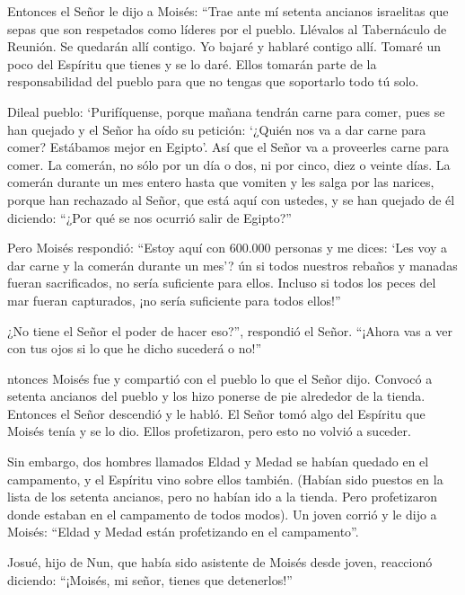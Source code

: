  Entonces el Señor le dijo a Moisés: ``Trae ante mí setenta
ancianos israelitas que sepas que son respetados como líderes por el
pueblo. Llévalos al Tabernáculo de Reunión. Se quedarán allí contigo.
 Yo bajaré y hablaré contigo allí. Tomaré un poco del
Espíritu que tienes y se lo daré. Ellos tomarán parte de la
responsabilidad del pueblo para que no tengas que soportarlo todo tú
solo.

 Dileal pueblo: `Purifíquense, porque mañana tendrán carne
para comer, pues se han quejado y el Señor ha oído su petición: `¿Quién
nos va a dar carne para comer? Estábamos mejor en Egipto'. Así que el
Señor va a proveerles carne para comer.  La comerán, no
sólo por un día o dos, ni por cinco, diez o veinte días. 
La comerán durante un mes entero hasta que vomiten y les salga por las
narices, porque han rechazado al Señor, que está aquí con ustedes, y se
han quejado de él diciendo: ``¿Por qué se nos ocurrió salir de Egipto?''

 Pero Moisés respondió: ``Estoy aquí con 600.000 personas y
me dices: `Les voy a dar carne y la comerán durante un mes'?
 ún si todos nuestros rebaños y manadas fueran
sacrificados, no sería suficiente para ellos. Incluso si todos los peces
del mar fueran capturados, ¡no sería suficiente para todos ellos!''

 ¿No tiene el Señor el poder de hacer eso?'', respondió el
Señor. ``¡Ahora vas a ver con tus ojos si lo que he dicho sucederá o
no!''

 ntonces Moisés fue y compartió con el pueblo lo que el
Señor dijo. Convocó a setenta ancianos del pueblo y los hizo ponerse de
pie alrededor de la tienda.  Entonces el Señor descendió y
le habló. El Señor tomó algo del Espíritu que Moisés tenía y se lo dio.
Ellos profetizaron, pero esto no volvió a suceder.

 Sin embargo, dos hombres llamados Eldad y Medad se habían
quedado en el campamento, y el Espíritu vino sobre ellos también.
(Habían sido puestos en la lista de los setenta ancianos, pero no habían
ido a la tienda. Pero profetizaron donde estaban en el campamento de
todos modos).  Un joven corrió y le dijo a Moisés: ``Eldad
y Medad están profetizando en el campamento''.

 Josué, hijo de Nun, que había sido asistente de Moisés
desde joven, reaccionó diciendo: ``¡Moisés, mi señor, tienes que
detenerlos!''

